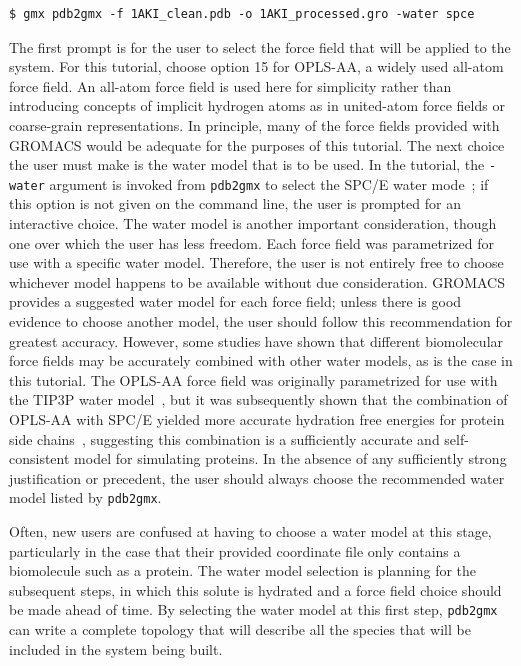 \documentclass[9pt,tutorial,pubversion]{livecoms}
\begin{document}
\begin{lstlisting}
$ gmx pdb2gmx -f 1AKI_clean.pdb -o 1AKI_processed.gro -water spce
\end{lstlisting}
%
The first prompt is for the user to select the force field that will be applied to the system. For this tutorial, choose option 15 for OPLS-AA, a widely used all-atom force field. An all-atom force field is used here for simplicity rather than introducing concepts of implicit hydrogen atoms as in united-atom force fields or coarse-grain representations. In principle, many of the force fields provided with GROMACS would be adequate for the purposes of this tutorial. The next choice the user must make is the water model that is to be used. In the tutorial, the \texttt{-water} argument is invoked from \texttt{pdb2gmx} to select the SPC/E water mode~\cite{Berendsen1987}; if this option is not given on the command line, the user is prompted for an interactive choice. The water model is another important consideration, though one over which the user has less freedom. Each force field was parametrized for use with a specific water model. Therefore, the user is not entirely free to choose whichever model happens to be available without due consideration. GROMACS provides a suggested water model for each force field; unless there is good evidence to choose another model, the user should follow this recommendation for greatest accuracy. However, some studies have shown that different biomolecular force fields may be accurately combined with other water models, as is the case in this tutorial. The OPLS-AA force field was originally parametrized for use with the TIP3P water model~\cite{Jorgensen1983}, but it was subsequently shown that the combination of OPLS-AA with SPC/E yielded more accurate hydration free energies for protein side chains~\cite{Hess2006}, suggesting this combination is a sufficiently accurate and self-consistent model for simulating proteins. In the absence of any sufficiently strong justification or precedent, the user should always choose the recommended water model listed by \texttt{pdb2gmx}.

Often, new users are confused at having to choose a water model at this stage, particularly in the case that their provided coordinate file only contains a biomolecule such as a protein. The water model selection is planning for the subsequent steps, in which this solute is hydrated and a force field choice should be made ahead of time. By selecting the water model at this first step, \texttt{pdb2gmx} can write a complete topology that will describe all the species that will be included in the system being built.
\end{document}
